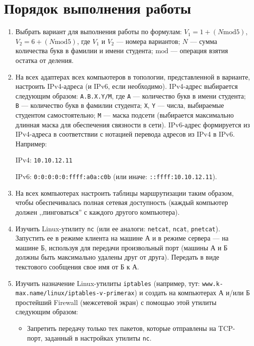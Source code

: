 \section{Порядок выполнения работы}
\begin{enumerate}
    \item Выбрать вариант для выполнения работы по формулам:
    $V_1 = 1 + (N \mathrm{mod} 5)$, $V_2 = 6 + (N \mathrm{mod} 5)$,
    где $V_1$ и $V_2$ --- номера вариантов;
    $N$ --- сумма количества букв в фамилии и имени студента;
    $\mathrm{mod}$ --- операция взятия остатка от деления.

    \item На всех адаптерах всех компьютеров в топологии,
    представленной в варианте, настроить IPv4-адреса (и IPv6, если необходимо).
    IPv4-адрес выбирается следующим образом: \texttt{A.B.X.Y/M},
    где \texttt{A} --- количество букв в имени студента;
    \texttt{B} --- количество букв в фамилии студента;
    \texttt{X}, \texttt{Y} --- числа, выбираемые студентом самостоятельно;
    \texttt{M} --- маска подсети (выбирается максимально длинная маска для обеспечения связности в сети).
    IPv6-адрес формируется из IPv4-адреса в соответствии с нотацией перевода адресов из IPv4 в IPv6.
    Например:

    IPv4: \texttt{10.10.12.11}

    IPv6: \texttt{0:0:0:0:0:ffff:a0a:c0b} (или иначе: \texttt{::ffff:10.10.12.11}).

    \item На всех компьютерах настроить таблицы маршрутизации таким образом,
    чтобы обеспечивалась полная сетевая доступность
    (каждый компьютер должен ,,пинговаться'' с каждого другого компьютера).

    \item Изучить Linux-утилиту \texttt{nc} (или ее аналоги: \texttt{netcat}, \texttt{ncat}, \texttt{pnetcat}).
    Запустить ее в режиме клиента на машине А и в режиме сервера --- на машине Б,
    используя для передачи произвольный порт (машины А и Б должны быть максимально удалены друг от друга).
    Передать в виде текстового сообщения свое имя от Б к А.

    \item Изучить назначение Linux-утилиты \texttt{iptables}
    (например, тут: \texttt{www.k-max.name/linux/iptables-v-primerax})
    и создать на компьютерах А и/или Б простейший Firewall (межсетевой экран)
    с помощью этой утилиты следующим образом:

    \begin{itemize}
        \item Запретить передачу только тех пакетов, которые отправлены на TCP-порт,
        заданный в настройках утилиты \texttt{nc}.


\end{itemize}
\end{enumerate}
